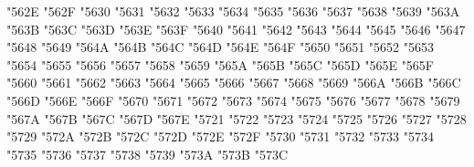 {\Uchar\jis"562E %
\Uchar\jis"562F %
\Uchar\jis"5630 %
\Uchar\jis"5631 %
\Uchar\jis"5632 %
\Uchar\jis"5633 %
\Uchar\jis"5634 %
\Uchar\jis"5635 %
\Uchar\jis"5636 %
\Uchar\jis"5637 %
\Uchar\jis"5638 %
\Uchar\jis"5639 %
\Uchar\jis"563A %
\Uchar\jis"563B %
\Uchar\jis"563C %
\Uchar\jis"563D %
\Uchar\jis"563E %
\Uchar\jis"563F %
\Uchar\jis"5640 %
\Uchar\jis"5641 %
\Uchar\jis"5642 %
\Uchar\jis"5643 %
\Uchar\jis"5644 %
\Uchar\jis"5645 %
\Uchar\jis"5646 %
\Uchar\jis"5647 %
\Uchar\jis"5648 %
\Uchar\jis"5649 %
\Uchar\jis"564A %
\Uchar\jis"564B %
\Uchar\jis"564C %
\Uchar\jis"564D %
\Uchar\jis"564E %
\Uchar\jis"564F %
\Uchar\jis"5650 %
\Uchar\jis"5651 %
\Uchar\jis"5652 %
\Uchar\jis"5653 %
\Uchar\jis"5654 %
\Uchar\jis"5655 %
\Uchar\jis"5656 %
\Uchar\jis"5657 %
\Uchar\jis"5658 %
\Uchar\jis"5659 %
\Uchar\jis"565A %
\Uchar\jis"565B %
\Uchar\jis"565C %
\Uchar\jis"565D %
\Uchar\jis"565E %
\Uchar\jis"565F %
\Uchar\jis"5660 %
\Uchar\jis"5661 %
\Uchar\jis"5662 %
\Uchar\jis"5663 %
\Uchar\jis"5664 %
\Uchar\jis"5665 %
\Uchar\jis"5666 %
\Uchar\jis"5667 %
\Uchar\jis"5668 %
\Uchar\jis"5669 %
\Uchar\jis"566A %
\Uchar\jis"566B %
\Uchar\jis"566C %
\Uchar\jis"566D %
\Uchar\jis"566E %
\Uchar\jis"566F %
\Uchar\jis"5670 %
\Uchar\jis"5671 %
\Uchar\jis"5672 %
\Uchar\jis"5673 %
\Uchar\jis"5674 %
\Uchar\jis"5675 %
\Uchar\jis"5676 %
\Uchar\jis"5677 %
\Uchar\jis"5678 %
\Uchar\jis"5679 %
\Uchar\jis"567A %
\Uchar\jis"567B %
\Uchar\jis"567C %
\Uchar\jis"567D %
\Uchar\jis"567E %
\Uchar\jis"5721 %
\Uchar\jis"5722 %
\Uchar\jis"5723 %
\Uchar\jis"5724 %
\Uchar\jis"5725 %
\Uchar\jis"5726 %
\Uchar\jis"5727 %
\Uchar\jis"5728 %
\Uchar\jis"5729 %
\Uchar\jis"572A %
\Uchar\jis"572B %
\Uchar\jis"572C %
\Uchar\jis"572D %
\Uchar\jis"572E %
\Uchar\jis"572F %
\Uchar\jis"5730 %
\Uchar\jis"5731 %
\Uchar\jis"5732 %
\Uchar\jis"5733 %
\Uchar\jis"5734 %
\Uchar\jis"5735 %
\Uchar\jis"5736 %
\Uchar\jis"5737 %
\Uchar\jis"5738 %
\Uchar\jis"5739 %
\Uchar\jis"573A %
\Uchar\jis"573B %
\Uchar\jis"573C %
}
